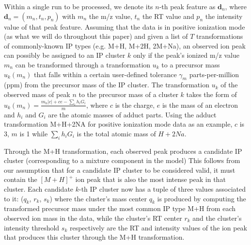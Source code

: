 Within a single run to be processed, we denote its $n$-th peak feature as $\textbf{d}_n$, where $\boldsymbol{d}_n=(m_n,t_n,p_n)$ with $m_n$ the m/z value, $t_n$ the RT value and $p_n$ the intensity value of that peak feature. Assuming that the data is in positive ionization mode (as what we will do throughout this paper) and given a list of $T$ transformations of commonly-known IP types (e.g. M+H, M+2H, 2M+Na), an observed ion peak can possibly be assigned to an IP cluster $k$ only if the peak's ionized m/z value $m_n $ can be transformed through a transformation $u_k$ to a precursor mass $u_k(m_n)$ that falls within a certain user-defined tolerance $\gamma_m$ parts-per-million (ppm) from the precursor mass of the IP cluster. The transformation $u_k$ of the observed mass of peak $n$ to the precursor mass of a cluster $k$ takes the form of $u_k(m_n) = \frac{m_n|c|+ce-\sum_{i} h_i G_i}{m}$, where $c$ is the charge, $e$ is the mass of an electron and $h_i$ and $G_i$ are the atomic masses of adduct parts. Using the adduct transformation M+H+2NA for positive ionization mode data as an example, $c$ is 3, $m$ is 1 while $\sum_{i} h_i G_i$ is the total atomic mass of $H+2Na$. 

Through the M+H transformation, each observed peak produces a candidate IP cluster (corresponding to a mixture component in the model)  This follows from our assumption that for a candidate IP cluster to be considered valid, it must contain the $[M+H]^+$ ion peak that is also the most intense peak in that cluster. Each candidate $k$-th IP cluster now has a tuple of three values associated to it: ($q_k$, $r_k$, $s_k$) where the cluster's mass center $q_k$ is produced by computing the transformed precursor mass under the most common IP type M+H from each observed ion mass in the data, while the cluster's RT center $r_k$ and the cluster's intensity threshold $s_k$ respectively are the RT and intensity values of the ion peak that produces this cluster through the M+H transformation. 

